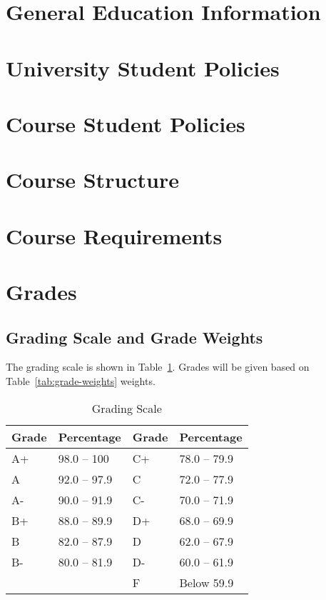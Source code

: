 \documentclass[12pt, letterpaper]{article}
\begin{document}
\section*{General Education Information}

\section*{University Student Policies}

\section*{Course Student Policies}

\section*{Course Structure}

\section*{Course Requirements}

\section*{Grades}

\subsection*{Grading Scale and Grade Weights}  
The grading scale is shown in Table~\ref{tab:grading-scale}. Grades will be given based on Table~\ref{tab:grade-weights} weights.

\begin{table}[ht]
\centering
\caption{Grading Scale}
\begin{tabular}{llll}
\toprule
\textbf{Grade} & \textbf{Percentage} & \textbf{Grade} & \textbf{Percentage} \\ \hline
        A+ & 98.0 -- 100  & C+ & 78.0 -- 79.9 \\
        A  & 92.0 -- 97.9 & C  & 72.0 -- 77.9 \\
        A- & 90.0 -- 91.9 & C- & 70.0 -- 71.9 \\
        B+ & 88.0 -- 89.9 & D+ & 68.0 -- 69.9 \\
        B  & 82.0 -- 87.9 & D  & 62.0 -- 67.9 \\
        B- & 80.0 -- 81.9 & D- & 60.0 -- 61.9 \\
           &              & F  & Below 59.9   \\
\bottomrule
\end{tabular}
\label{tab:grading-scale}
\end{table}
\end{document}
